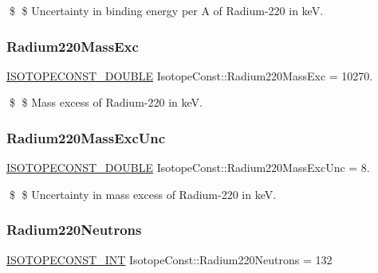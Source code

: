 \$ \$ Uncertainty in binding energy per A of Radium-\/220 in keV. \mbox{\label{group___isotope_const-_radium-_ra220_gab6e80910d4057d14f43286634e6b43d4}} 
\subsubsection{\texorpdfstring{Radium220\+Mass\+Exc}{Radium220MassExc}}
{\footnotesize\ttfamily \mbox{\hyperlink{group___isotope_const-_macros_ga8f45a7272ce02c0b4c65c44636ed719a}{I\+S\+O\+T\+O\+P\+E\+C\+O\+N\+S\+T\+\_\+\+D\+O\+U\+B\+LE}} Isotope\+Const\+::\+Radium220\+Mass\+Exc = 10270.}

\$ \$ Mass excess of Radium-\/220 in keV. \mbox{\label{group___isotope_const-_radium-_ra220_ga04503913755071986e13edb7d8b70030}} 
\subsubsection{\texorpdfstring{Radium220\+Mass\+Exc\+Unc}{Radium220MassExcUnc}}
{\footnotesize\ttfamily \mbox{\hyperlink{group___isotope_const-_macros_ga8f45a7272ce02c0b4c65c44636ed719a}{I\+S\+O\+T\+O\+P\+E\+C\+O\+N\+S\+T\+\_\+\+D\+O\+U\+B\+LE}} Isotope\+Const\+::\+Radium220\+Mass\+Exc\+Unc = 8.}

\$ \$ Uncertainty in mass excess of Radium-\/220 in keV. \mbox{\label{group___isotope_const-_radium-_ra220_gaf3e269c35ff69f66d6a70730557e04ac}} 
\subsubsection{\texorpdfstring{Radium220\+Neutrons}{Radium220Neutrons}}
{\footnotesize\ttfamily \mbox{\hyperlink{group___isotope_const-_macros_ga5f18360b3e99483a35c32d789e62621c}{I\+S\+O\+T\+O\+P\+E\+C\+O\+N\+S\+T\+\_\+\+I\+NT}} Isotope\+Const\+::\+Radium220\+Neutrons = 132}

